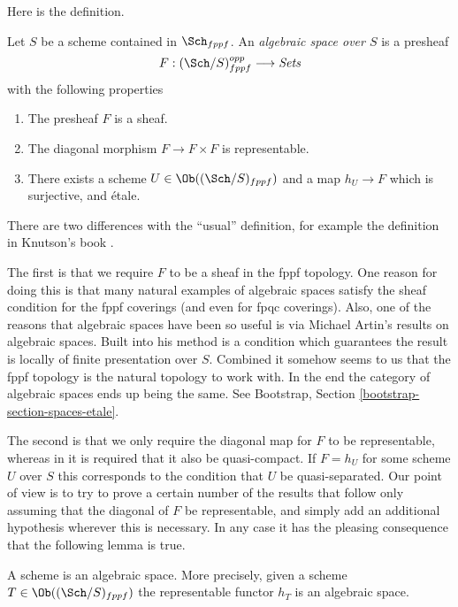 \noindent
Here is the definition.

\begin{definition}
\label{definition-algebraic-space}
Let $S$ be a scheme contained in $\Sch_{fppf}$.
An {\it algebraic space over $S$} is a presheaf
$$
F : (\Sch/S)^{opp}_{fppf} \longrightarrow \textit{Sets}
$$
with the following properties
\begin{enumerate}
\item The presheaf $F$ is a sheaf.
\item The diagonal morphism $F  \to F \times F$ is representable.
\item There exists a scheme $U \in \Ob((\Sch/S)_{fppf})$
and a map $h_U \to F$ which is surjective, and \'etale.
\end{enumerate}
\end{definition}

\noindent
There are two differences with the ``usual'' definition, for example the
definition in Knutson's book \cite{Kn}.

\medskip\noindent
The first is that we require $F$ to be a sheaf in the fppf topology.
One reason for doing this is that many natural examples
of algebraic spaces satisfy the sheaf condition for the fppf coverings
(and even for fpqc coverings). Also, one of the reasons that algebraic
spaces have been so useful is via Michael Artin's results on algebraic spaces.
Built into his method is a condition which guarantees the result is
locally of finite presentation over $S$.
Combined it somehow seems to us that the fppf topology
is the natural topology to work with. In the end the category
of algebraic spaces ends up being the same. See
Bootstrap, Section \ref{bootstrap-section-spaces-etale}.

\medskip\noindent
The second is that we only require the diagonal map for $F$ to be
representable, whereas in \cite{Kn} it is required that it also
be quasi-compact. If $F = h_U$ for some scheme $U$ over $S$
this corresponds to the condition that $U$ be quasi-separated.
Our point of view is to try to prove a certain
number of the results that follow only assuming that the diagonal
of $F$ be representable, and simply add an additional hypothesis wherever
this is necessary. In any case it has the pleasing consequence that
the following lemma is true.

\begin{lemma}
\label{lemma-scheme-is-space}
A scheme is an algebraic space. More precisely,
given a scheme $T \in \Ob((\Sch/S)_{fppf})$
the representable functor $h_T$ is an algebraic space.
\end{lemma}

